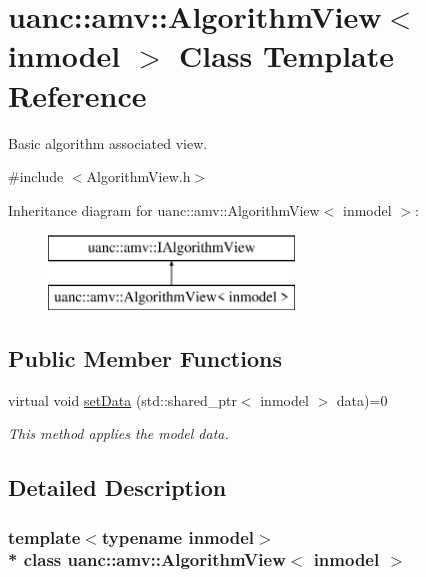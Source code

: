 \hypertarget{classuanc_1_1amv_1_1_algorithm_view}{}\section{uanc\+:\+:amv\+:\+:Algorithm\+View$<$ inmodel $>$ Class Template Reference}
\label{classuanc_1_1amv_1_1_algorithm_view}


Basic algorithm associated view.  




{\ttfamily \#include $<$Algorithm\+View.\+h$>$}

Inheritance diagram for uanc\+:\+:amv\+:\+:Algorithm\+View$<$ inmodel $>$\+:\begin{figure}[H]
\begin{center}
\leavevmode
\includegraphics[height=2.000000cm]{classuanc_1_1amv_1_1_algorithm_view}
\end{center}
\end{figure}
\subsection*{Public Member Functions}
\begin{DoxyCompactItemize}
\item 
virtual void \hyperlink{classuanc_1_1amv_1_1_algorithm_view_ad656cf5223a66a942441ee39f44f65a3}{set\+Data} (std\+::shared\+\_\+ptr$<$ inmodel $>$ data)=0
\begin{DoxyCompactList}\small\item\em This method applies the model data. \end{DoxyCompactList}\end{DoxyCompactItemize}


\subsection{Detailed Description}
\subsubsection*{template$<$typename inmodel$>$\\*
class uanc\+::amv\+::\+Algorithm\+View$<$ inmodel $>$}

